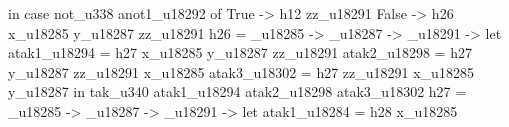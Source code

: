                                                                                                                                                                                               in case not_u338 anot1_u18292 of
                                                                                                                                                                                                   True ->
                                                                                                                                                                                                     h12 zz_u18291
                                                                                                                                                                                                   False ->
                                                                                                                                                                                                     h26 x_u18285 y_u18287 zz_u18291
                                                                                                                                                h26 = \x_u18285 -> \y_u18287 -> \zz_u18291 -> let
                                                                                                                                                                                                atak1_u18294 = h27 x_u18285 y_u18287 zz_u18291
                                                                                                                                                                                                atak2_u18298 = h27 y_u18287 zz_u18291 x_u18285
                                                                                                                                                                                                atak3_u18302 = h27 zz_u18291 x_u18285 y_u18287
                                                                                                                                                                                              in tak_u340 atak1_u18294 atak2_u18298 atak3_u18302
                                                                                                                                                h27 = \x_u18285 -> \y_u18287 -> \zz_u18291 -> let
                                                                                                                                                                                                atak1_u18284 = h28 x_u18285
